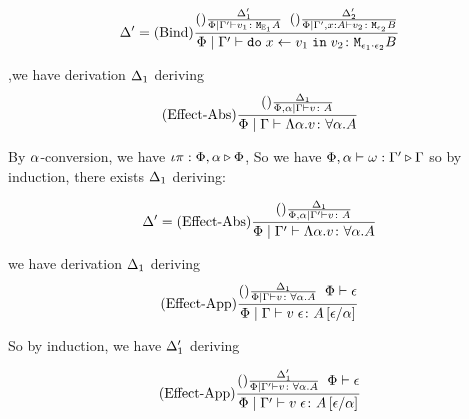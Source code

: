 {    \begin{equation}
        \Delta' = (\text{Bind}) \frac{
            (\text{}) \frac{\Delta_1'}{\Phi\mid\Gamma' \vdash v_1 \colon \texttt{M}_{\mathbb{E}_1}{A}}
            \;\;
            (\text{}) \frac{\Delta_2'}{\Phi\mid\Gamma',x: A \vdash v_2 \colon \texttt{M}_{\epsilon_2}{B}}
        }{
            \Phi\mid\Gamma' \vdash \texttt{do}\; x \leftarrow v_1 \;\texttt{in}\; v_2 \colon \texttt{M}_{\epsilon_1\cdot\epsilon_2}{B}
        }
    \end{equation}

        \bi,we have derivation $\Delta_1$ deriving
        \begin{equation}
            (\text{Effect-Abs}) \frac{
                    (\text{}) \frac{\Delta_1}{\Phi,\alpha\mid\Gamma \vdash v \colon A}}{\Phi\mid\Gamma \vdash \Lambda \alpha. v \colon \forall \alpha. A
                    }
        \end{equation}
        
        By $\alpha$-conversion, we have $\iota\pi : \Phi,\alpha \triangleright \Phi$,
        So we have $\Phi,\alpha\vdash \omega : \Gamma' \triangleright \Gamma$ so by induction, there exists $\Delta_1$ deriving:

        \begin{equation}
            \D' = 
            \treerule{Effect-Abs}{
                \treerule{}{\D_1}{\etyperelation{\P,\a}{\G'}{v}{A}}
            }{
                \etyperelation{
                    \P
                }{
                    \G'
                }{
                    \elam{\a}{v}
                }{\all{\a}{A}}
            }
        \end{equation}

    \bi we have derivation $\Delta_1$ deriving
    \begin{equation}
        (\text{Effect-App}) \frac{
            (\text{}) \frac{\Delta_1}{\Phi\mid\Gamma \vdash v \colon \forall \alpha. A}
            \;\;
           \Phi\vdash \epsilon
        }{
            \Phi\mid\Gamma \vdash v\;\epsilon \colon A\left[\epsilon / \alpha\right]
        }
    \end{equation}

    So by induction, we have $\Delta_1'$ deriving

    \begin{equation}
        (\text{Effect-App}) \frac{
            (\text{}) \frac{\Delta_1'}{\Phi\mid\Gamma' \vdash v \colon \forall \alpha. A}
            \;\;
           \Phi\vdash \epsilon
        }{
            \Phi\mid\Gamma' \vdash v\;\epsilon \colon A\left[\epsilon / \alpha\right]
        }
    \end{equation}
}

\ifdefined\NoDocument
\else
\documentclass{report}


   \Weakening

\fi